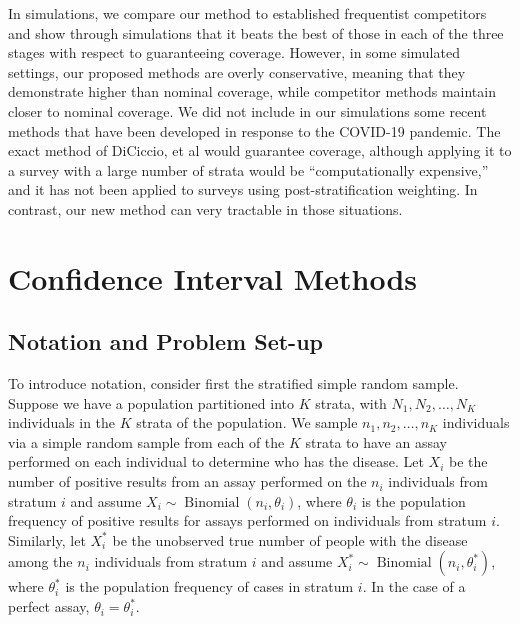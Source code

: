 In simulations, we compare our method to established frequentist competitors and show through simulations that it beats the best of those in each of the three stages with respect to guaranteeing coverage.
However, in some simulated settings, our proposed methods are overly conservative, meaning that they demonstrate higher than nominal coverage, while competitor methods maintain closer to nominal coverage.
We did not include in our simulations some recent methods that have been developed in response to the COVID-19 pandemic.\cite{Cai:2020,DiCi:2021,rosin2021estimating}
The exact method of DiCiccio, et al\cite{DiCi:2021} would guarantee coverage, although applying it to a survey with a large number of strata would be ``computationally expensive,'' and it has not been applied to surveys using post-stratification weighting. In contrast, our new method can very tractable in those situations.


\section{Confidence Interval Methods}

\subsection{Notation and Problem Set-up}
\label{sec-notation}


To introduce notation, consider first the stratified simple random sample.
Suppose we have a population partitioned into \( K \) strata, with \( N_1, N_2, \ldots, N_K \) individuals in the \( K \) strata of the population.
We sample \( n_1, n_2, \ldots, n_K \) individuals via a simple random sample from each of the \( K \) strata to have an assay performed on each individual to determine who has the disease.
Let \( X_i \) be the number of positive results from an assay performed on the \( n_i \) individuals from stratum \( i \) and assume \( X_i \sim \operatorname{Binomial}(n_i, \theta_i) \), where \( \theta_i \) is the population frequency of positive results for assays performed on individuals from stratum \( i \).
Similarly, let \( X_i^* \) be the unobserved true number of people with the disease among the \( n_i \) individuals from stratum \( i \) and assume \( X_i^* \sim \operatorname{Binomial}(n_i, \theta_i^*) \), where \( \theta_i^* \) is the population frequency of cases in stratum \( i \).
In the case of a perfect assay, \( \theta_i = \theta_i^* \).




